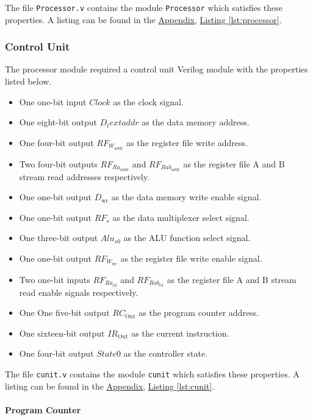 The file \verb|Processor.v| contains the module \verb|Processor| which satisfies these properties.
A listing can be found in the \hyperref[sec:appendix]{Appendix}, \hyperref[lst:processor]{Listing \ref*{lst:processor}}.

\subsubsection{Control Unit} \label{subsub:controlunit}

The processor module required a control unit Verilog module with the properties listed below.

\begin{itemize}
    \item One one-bit input $Clock$ as the clock signal.
    \item One eight-bit output $D_text{addr}$ as the data memory address.
    \item One four-bit output $RF_{W_\text{addr}}$ as the register file write address.
    \item Two four-bit outputs $RF_{Ra_\text{addr}}$ and $RF_{Rab_\text{addr}}$ as the register file A and B stream read addresses respectively.
    \item One one-bit output $D_\text{wr}$ as the data memory write enable signal.
    \item One one-bit output $RF_s$ as the data multiplexer select signal.
    \item One three-bit output $Alu_{s0}$ as the ALU function select signal.
    \item One one-bit output $RF_{W_\text{wr}}$ as the register file write enable signal.
    \item Two one-bit inputs $RF_{Ra_\text{rd}}$ and $RF_{Rab_\text{rd}}$ as the register file A and B stream read enable signals respectively.
    \item One One five-bit output $RC_\text{Out}$ as the program counter address.
    \item One sixteen-bit output $IR_\text{Out}$ as the current instruction.
    \item One four-bit output $State0$ as the controller state. 
\end{itemize}

The file \verb|cunit.v| contains the module \verb|cunit| which satisfies these properties.
A listing can be found in the \hyperref[sec:appendix]{Appendix}, \hyperref[lst:cunit]{Listing \ref*{lst:cunit}}.

\paragraph{Program Counter} \label{par:pc}

